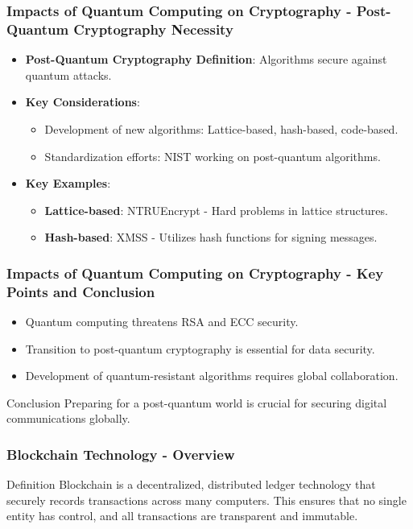 \documentclass{beamer}
\begin{document}
\begin{frame}[fragile]
    \frametitle{Impacts of Quantum Computing on Cryptography - Post-Quantum Cryptography Necessity}
    \begin{itemize}
        \item \textbf{Post-Quantum Cryptography Definition}: Algorithms secure against quantum attacks.
        \item \textbf{Key Considerations}:
        \begin{itemize}
            \item Development of new algorithms: Lattice-based, hash-based, code-based.
            \item Standardization efforts: NIST working on post-quantum algorithms.
        \end{itemize}
        \item \textbf{Key Examples}:
        \begin{itemize}
            \item \textbf{Lattice-based}: NTRUEncrypt - Hard problems in lattice structures.
            \item \textbf{Hash-based}: XMSS - Utilizes hash functions for signing messages.
        \end{itemize}
    \end{itemize}
\end{frame}

\begin{frame}[fragile]
    \frametitle{Impacts of Quantum Computing on Cryptography - Key Points and Conclusion}
    \begin{itemize}
        \item Quantum computing threatens RSA and ECC security.
        \item Transition to post-quantum cryptography is essential for data security.
        \item Development of quantum-resistant algorithms requires global collaboration.
    \end{itemize}

    \begin{block}{Conclusion}
        Preparing for a post-quantum world is crucial for securing digital communications globally.
    \end{block}
\end{frame}

\begin{frame}[fragile]
    \frametitle{Blockchain Technology - Overview}
    \begin{block}{Definition}
        Blockchain is a decentralized, distributed ledger technology that securely records transactions across many computers. 
        This ensures that no single entity has control, and all transactions are transparent and immutable.
    \end{block}
\end{frame}
\end{document}
